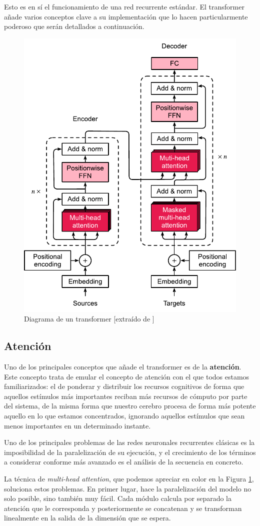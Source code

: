 Esto es en sí el funcionamiento de una red recurrente estándar. El transformer añade varios conceptos clave a su implementación que lo hacen particularmente poderoso que serán detallados a continuación.

\begin{figure}[h]
    \centering
    \includegraphics[width=.5\textwidth]{media/transformer.pdf}
    \caption{Diagrama de un transformer [extraído de \cite{TransformerAshish2017}]}
    \label{fig:transformer}
\end{figure}

\subsection{Atención}
Uno de los principales conceptos que añade el transformer es de la \textbf{atención}. Este concepto trata de emular el concepto de atención con el que todos estamos familiarizados: el de ponderar y distribuir los recursos cognitivos de forma que aquellos estímulos más importantes reciban más recursos de cómputo por parte del sistema, de la misma forma que nuestro cerebro procesa de forma más potente aquello en lo que estamos concentrados, ignorando aquellos estímulos que sean menos importantes en un determinado instante.

Uno de los principales problemas de las redes neuronales recurrentes clásicas es la imposibilidad de la paralelización de su ejecución, y el crecimiento de los términos a considerar conforme más avanzado es el análisis de la secuencia en concreto.

La técnica de \textit{multi-head attention}, que podemos apreciar en color en la Figura \ref{fig:transformer}, soluciona estos problemas. En primer lugar, hace la paralelización del modelo no solo posible, sino también muy fácil. Cada módulo calcula por separado la atención que le corresponda y posteriormente se concatenan y se transforman linealmente en la salida de la dimensión que se espera. 

